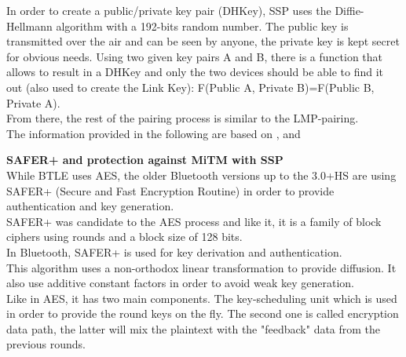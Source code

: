 In order to create a public/private key pair (DHKey), SSP uses the Diffie-Hellmann algorithm with a 192-bits random number. The public key is transmitted over the air and can be seen by anyone, the private key is kept secret for obvious needs. 
Using two given key pairs A and B, there is a function that allows to result in a DHKey and only the two devices should be able to find it out (also used to create the Link Key): F(Public A, Private B)=F(Public B, Private A). \\ 
From there, the rest of the pairing process is similar to the LMP-pairing.\\

\noindent The information provided in the following are based on \cite{btsecoverview}, \cite{pairmech} and \cite{ellisys}

\newpage
\textbf{SAFER+ and protection against MiTM with SSP}\\

While BTLE uses AES, the older Bluetooth versions up to the 3.0+HS are using SAFER+ (Secure and Fast Encryption Routine) in order to provide authentication and key generation.\\
SAFER+ was candidate to the AES process and like it, it is a family of block ciphers using rounds and a block size of 128 bits.\\
In Bluetooth, SAFER+ is used for key derivation and authentication.\\
This algorithm uses a non-orthodox linear transformation to provide diffusion. It also use additive constant factors in order to avoid weak key generation.\\
Like in AES, it has two main components. The key-scheduling unit which is used in order to provide the round keys on the fly. The second one is called encryption data path, the latter will mix the plaintext with the "feedback" data from the previous rounds.\\

